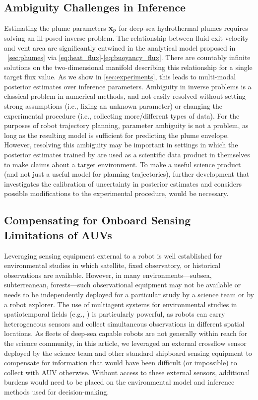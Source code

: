 \subsection{Ambiguity Challenges in Inference}
Estimating the plume parameters $\mathbf{x}_p$ for deep-sea hydrothermal plumes requires solving an ill-posed inverse problem. The relationship between fluid exit velocity and vent area are significantly entwined in the analytical model proposed in ~\cref{sec:phumes} via \cref{eq:heat_flux}-\cref{eq:buoyancy_flux}. There are countably infinite solutions on the two-dimensional manifold describing this relationship for a single target flux value. As we show in \cref{sec:experiments}, this leads to multi-modal posterior estimates over inference parameters. Ambiguity in inverse problems is a classical problem in numerical methods, and not easily resolved without setting strong assumptions (i.e., fixing an unknown parameter) or changing the experimental procedure (i.e., collecting more/different types of data). For the purposes of robot trajectory planning, parameter ambiguity is not a problem, as long as the resulting model is sufficient for predicting the plume envelope. However, resolving this ambiguity may be important in settings in which the posterior estimates trained by \PHUMES are used as a scientific data product in themselves to make claims about a target environment. To make \PHUMES a useful science product (and not just a useful model for planning trajectories), further development that investigates the calibration of uncertainty in posterior estimates and considers possible modifications to the experimental procedure, would be necessary. 

\subsection{Compensating for Onboard Sensing Limitations of AUVs}
Leveraging sensing equipment external to a robot is well established for environmental studies in which satellite, fixed observatory, or historical observations are available. However, in many environments---subsea, subterreanean, forests---such observational equipment may not be available or needs to be independently deployed for a particular study by a science team or by a robot explorer. The use of multiagent systems for environmental studies in spatiotemporal fields (e.g., \autocite{salam2019adaptive,li2014multi,luo2018adaptive,ouyang2014multi}) is particularly powerful, as robots can carry heterogeneous sensors and collect simultaneous observations in different spatial locations. As fleets of deep-sea capable robots are not generally within reach for the science community, in this article, we leveraged an external crossflow sensor deployed by the science team and other standard shipboard sensing equipment to compensate for information that would have been difficult (or impossible) to collect with AUV \Sentry otherwise. Without access to these external sensors, additional burdens would need to be placed on the environmental model and inference methods used for decision-making. 

